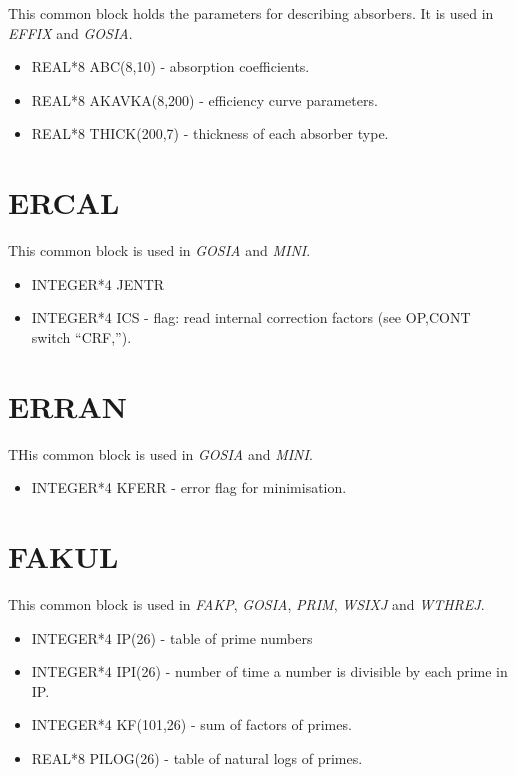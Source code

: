 This common block holds the parameters for describing absorbers. It is used
in {\em EFFIX} and {\em GOSIA}.

\begin{itemize}
\item REAL*8 ABC(8,10) - absorption coefficients.
\item REAL*8 AKAVKA(8,200) - efficiency curve parameters.
\item REAL*8 THICK(200,7) - thickness of each absorber type.
\end{itemize}

\section{ERCAL}

This common block is used in {\em GOSIA} and {\em MINI}.

\begin{itemize}
\item INTEGER*4 JENTR
\item INTEGER*4 ICS - flag: read internal correction factors (see OP,CONT
switch ``CRF,'').
\end{itemize}

\section{ERRAN}

THis common block is used in {\em GOSIA} and {\em MINI}.

\begin{itemize}
\item INTEGER*4 KFERR - error flag for minimisation.
\end{itemize}

\section{FAKUL}

This common block is used in {\em FAKP}, {\em GOSIA}, {\em PRIM}, {\em
WSIXJ} and {\em WTHREJ}.

\begin{itemize}
\item INTEGER*4 IP(26) - table of prime numbers
\item INTEGER*4 IPI(26) - number of time a number is divisible by each prime
in IP.
\item INTEGER*4 KF(101,26) - sum of factors of primes.
\item REAL*8 PILOG(26) - table of natural logs of primes.
\end{itemize}


